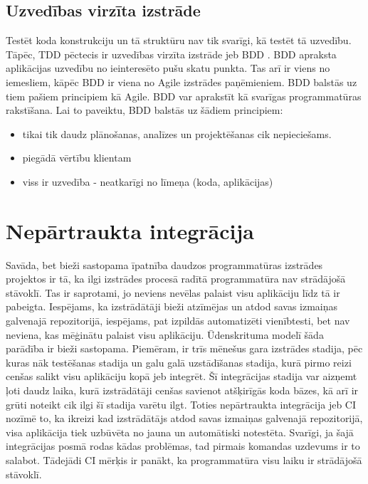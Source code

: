 \subsection{Uzvedības virzīta izstrāde}
Testēt koda konstrukciju un tā struktūru nav tik svarīgi, kā testēt tā uzvedību. Tāpēc, TDD pēctecis ir uzvedības virzīta izstrāde jeb BDD . BDD apraksta aplikācijas uzvedību no ieinteresēto pušu skatu punkta. Tas arī ir viens no iemesliem, kāpēc BDD ir viena no Agile izstrādes paņēmieniem. BDD balstās uz tiem pašiem principiem kā Agile.
BDD var aprakstīt kā svarīgas programmatūras rakstīšana. Lai to paveiktu, BDD balstās uz šādiem principiem:
\begin{itemize}
	\item tikai tik daudz plānošanas, analīzes un projektēšanas cik nepieciešams.
	\item piegādā vērtību klientam
	\item viss ir uzvedība - neatkarīgi no līmeņa (koda, aplikācijas)
\end{itemize}
\cite[11. nodaļa]{chelimsky2010Rspec}


\section{Nepārtraukta integrācija}
Savāda, bet bieži sastopama īpatnība daudzos programmatūras izstrādes projektos ir tā, ka ilgi izstrādes procesā radītā programmatūra nav strādājošā stāvoklī. Tas ir saprotami, jo neviens nevēlas palaist visu aplikāciju līdz tā ir pabeigta. Iespējams, ka izstrādātāji bieži atzīmējas un atdod savas izmaiņas galvenajā repozitorijā, iespējams, pat izpildās automatizēti vienībtesti, bet nav neviena, kas mēģinātu palaist visu aplikāciju. Ūdenskrituma modelī šāda parādība ir bieži sastopama. Piemēram, ir trīs mēnešus gara izstrādes stadija, pēc kuras nāk testēšanas stadija un galu galā uzstādīšanas stadija, kurā pirmo reizi cenšas salikt visu aplikāciju kopā jeb integrēt. Šī integrācijas stadija var aizņemt ļoti daudz laika, kurā izstrādātāji cenšas savienot atšķirīgās koda bāzes, kā arī ir grūti noteikt cik ilgi šī stadija varētu ilgt.
Toties nepārtraukta integrācija jeb CI  nozīmē to, ka ikreizi kad izstrādātājs atdod savas izmaiņas galvenajā repozitorijā, visa aplikācija tiek uzbūvēta no jauna un automātiski notestēta. Svarīgi, ja šajā integrācijas posmā rodas kādas problēmas, tad pirmais komandas uzdevums ir to salabot. Tādejādi CI mērķis ir panākt, ka programmatūra visu laiku ir strādājošā stāvoklī.


